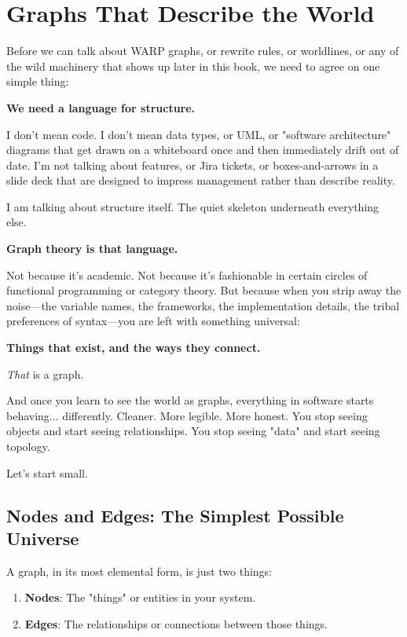 \chapter{Graphs That Describe the World}
\label{chap:graphs-describe-the-world}

Before we can talk about WARP graphs, or rewrite rules, or worldlines, or any of the wild machinery that shows up later in this book, we need to agree on one simple thing:

\textbf{We need a language for structure.}

I don't mean code. I don't mean data types, or UML, or "software architecture" diagrams that get drawn on a whiteboard once and then immediately drift out of date. I'm not talking about features, or Jira tickets, or boxes-and-arrows in a slide deck that are designed to impress management rather than describe reality.

I am talking about structure itself. The quiet skeleton underneath everything else.

\textbf{Graph theory is that language.}

Not because it's academic. Not because it's fashionable in certain circles of functional programming or category theory. But because when you strip away the noise—the variable names, the frameworks, the implementation details, the tribal preferences of syntax—you are left with something universal:

\textbf{Things that exist, and the ways they connect.}

\textit{That} is a graph.

And once you learn to see the world as graphs, everything in software starts behaving... differently. Cleaner. More legible. More honest. You stop seeing objects and start seeing relationships. You stop seeing "data" and start seeing topology.

Let's start small.

\section{Nodes and Edges: The Simplest Possible Universe}
\label{sec:nodes-and-edges}

A graph, in its most elemental form, is just two things:
\begin{enumerate}
    \item \textbf{Nodes}: The "things" or entities in your system.
    \item \textbf{Edges}: The relationships or connections between those things.
\end{enumerate}

